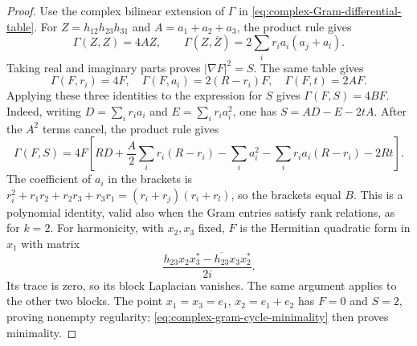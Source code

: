 \begin{proof}
Use the complex bilinear extension of $\Gamma$ in
\eqref{eq:complex-Gram-differential-table}.  For
$Z=h_{12}h_{23}h_{31}$ and $A=a_1+a_2+a_3$, the product rule gives
\[
 \Gamma(Z,Z)=4AZ,\qquad
 \Gamma(Z,\overline Z)=2\sum_i r_i a_i(a_j+a_l).
\]
Taking real and imaginary parts proves
$|\nabla F|^2=S$.  The same table gives
\begin{equation}\label{eq:complex-gram-cycle-pairings}
 \Gamma(F,r_i)=4F,\quad
 \Gamma(F,a_i)=2(R-r_i)F,\quad
 \Gamma(F,t)=2AF.
\end{equation}
Applying these three identities to the expression for $S$ gives
$\Gamma(F,S)=4BF$. Indeed, writing
$D=\sum_i r_i a_i$ and $E=\sum_i r_i a_i^2$, one has
$S=AD-E-2tA$. After the $A^2$ terms cancel, the product rule gives
\[
 \Gamma(F,S)=4F\left[
 RD+\frac A2\sum_i r_i(R-r_i)-\sum_i a_i^2
 -\sum_i r_i a_i(R-r_i)-2Rt\right].
\]
The coefficient of $a_i$ in the brackets is
$r_i^2+r_1r_2+r_2r_3+r_3r_1=(r_i+r_j)(r_i+r_l)$,
so the brackets equal $B$. This is a polynomial identity, valid
also when the Gram entries satisfy rank relations, as for $k=2$.
For harmonicity, with $x_2,x_3$ fixed, $F$ is the Hermitian
quadratic form in $x_1$ with matrix
\[
 \frac{h_{23}x_2x_3^*-\overline{h_{23}}x_3x_2^*}{2i}.
\]
Its trace is zero, so its block Laplacian vanishes.  The same
argument applies to the other two blocks.  The point
$x_1=x_3=e_1$, $x_2=e_1+e_2$ has $F=0$ and $S=2$, proving
nonempty regularity; \eqref{eq:complex-gram-cycle-minimality}
then proves minimality.

\end{proof}

